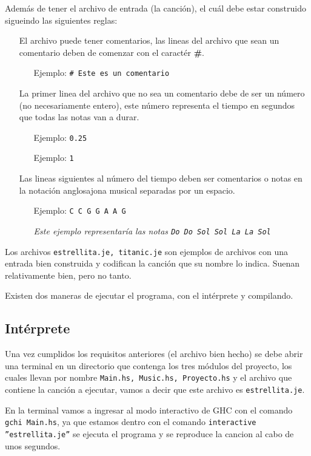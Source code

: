\documentclass[10pt,a4paper]{article}
\begin{document}
Además de tener el archivo de entrada (la canción), el cuál debe estar construido
sigueindo las siguientes reglas:
\begin{itemize}
\item[\textbullet] El archivo puede tener comentarios, las lineas del archivo que
  sean un comentario deben de comenzar con el caractér \textbf{\#}.
  \begin{itemize}
  \item [Ejemplo:] \texttt{\# Este es un comentario}
  \end{itemize}
\item[\textbullet] La primer linea del archivo que no sea un comentario debe de
  ser un número (no necesariamente entero), este número  representa el tiempo en
  segundos que todas las notas van a durar.
  \begin{itemize}
  \item [Ejemplo:] \texttt{0.25}
  \item [Ejemplo:] \texttt{1}
  \end{itemize}
\item[\textbullet] Las lineas siguientes al número del tiempo deben ser
  comentarios o notas en la notación anglosajona musical separadas por un espacio.
  \begin{itemize}
  \item [Ejemplo:] \texttt{C C G G A A G}

    \textit{Este ejemplo representaría las notas
      \texttt{Do Do Sol Sol La La Sol}}
  \end{itemize}
\end{itemize}

Los archivos \texttt{estrellita.je, titanic.je} son ejemplos de archivos con una
entrada bien construida y codifican la canción que su nombre lo indica. Suenan
relativamente bien, pero no tanto.

Existen dos maneras de ejecutar el programa, con el intérprete y compilando.

\subsection{Intérprete}
Una vez cumplidos los requisitos anteriores (el archivo bien hecho) se debe abrir
una terminal en un directorio que contenga los tres módulos del proyecto, los
cuales llevan por nombre \texttt{Main.hs, Music.hs, Proyecto.hs} y el archivo que
contiene la canción a ejecutar, vamos a decir que este archivo es
\texttt{estrellita.je}.

En la terminal vamos a ingresar al modo interactivo de GHC con el comando
\texttt{gchi Main.hs}, ya que estamos dentro con el comando
\texttt{interactive ''estrellita.je''} se ejecuta el programa y se reproduce la
cancion al cabo de unos segundos.
\end{document}
